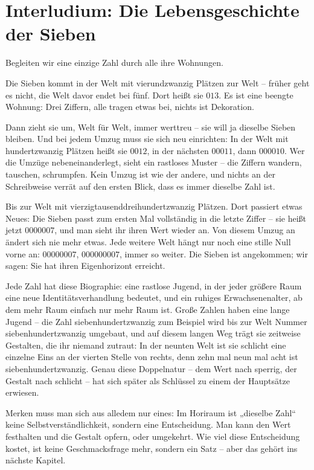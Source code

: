 \chapter*{Interludium: Die Lebensgeschichte der Sieben}

\begin{oberflaeche}
Begleiten wir eine einzige Zahl durch alle ihre Wohnungen.

Die Sieben kommt in der Welt mit vierundzwanzig Plätzen zur Welt --
früher geht es nicht, die Welt davor endet bei fünf. Dort
heißt sie $013$. Es ist eine beengte Wohnung: Drei Ziffern, alle
tragen etwas bei, nichts ist Dekoration.

Dann zieht sie um, Welt für Welt, immer werttreu -- sie will ja
dieselbe Sieben bleiben. Und bei jedem Umzug muss sie sich neu
einrichten: In der Welt mit hundertzwanzig Plätzen heißt sie
$0012$, in der nächsten $00011$, dann $000010$. Wer die Umzüge
nebeneinanderlegt, sieht ein rastloses Muster -- die Ziffern wandern,
tauschen, schrumpfen. Kein Umzug ist wie der andere, und nichts an
der Schreibweise verrät auf den ersten Blick, dass es immer dieselbe
Zahl ist.

Bis zur Welt mit vierzigtausenddreihundertzwanzig Plätzen. Dort
passiert etwas Neues: Die Sieben passt zum ersten Mal vollständig in
die letzte Ziffer -- sie heißt jetzt $0000007$, und man sieht ihr
ihren Wert wieder an. Von diesem Umzug an ändert sich nie mehr
etwas. Jede weitere Welt hängt nur noch eine stille Null vorne an:
$00000007$, $000000007$, immer so weiter. Die Sieben ist
angekommen; wir sagen: Sie hat ihren Eigenhorizont erreicht.

Jede Zahl hat diese Biographie: eine rastlose Jugend, in der jeder
größere Raum eine neue Identitätsverhandlung bedeutet, und ein
ruhiges Erwachsenenalter, ab dem mehr Raum einfach nur mehr Raum
ist. Große Zahlen haben eine lange Jugend -- die Zahl
siebenhundertzwanzig zum Beispiel wird bis zur Welt Nummer
siebenhundertzwanzig
umgebaut, und auf diesem langen Weg trägt sie zeitweise Gestalten,
die ihr niemand zutraut: In der neunten Welt ist sie schlicht eine
einzelne Eins an der vierten Stelle von rechts, denn zehn mal neun
mal acht ist siebenhundertzwanzig. Genau diese Doppelnatur -- dem
Wert nach sperrig, der Gestalt nach schlicht -- hat sich später als
Schlüssel zu einem der Hauptsätze erwiesen.

Merken muss man sich aus alledem nur eines: Im Horiraum ist
„dieselbe Zahl“ keine Selbstverständlichkeit, sondern eine
Entscheidung. Man kann den Wert festhalten und die Gestalt opfern,
oder umgekehrt. Wie viel diese Entscheidung kostet, ist keine
Geschmacksfrage mehr, sondern ein Satz -- aber das gehört ins
nächste Kapitel.
\end{oberflaeche}
